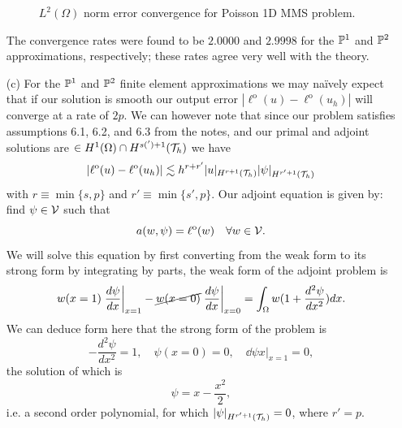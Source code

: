 \documentclass{article}
\begin{document}
\begin{itemize}
\begin{figure}[H]
		\caption{\(L^2(\Omega)\) norm error convergence for Poisson 1D MMS problem.}
		\label{fig:mms_l2}
	\end{figure}
	The convergence rates were found to be \(2.0000\) and \(2.9998\) for the \(\mathbb{P}^1 \) and \(\mathbb{P}^2 \) approximations, respectively; these rates agree very well with the theory.
	\item[(c)] For the \(\mathbb{P}^1 \) and \(\mathbb{P}^2 \) finite element approximations we may na\"ively expect that if our solution is smooth our output error \(|\ell^\text{o}(u) - \ell^\text{o}(u_h)| \) will converge at a rate of \(2p\). We can however note that since our problem satisfies assumptions 6.1, 6.2, and 6.3 from the notes, and our primal and adjoint solutions are \(\in H^1(\Omega) \cap H^{s(')+1}(\mathcal{T}_h) \) we have
	\begin{equation*}
		|\ell^\text{o}(u) - \ell^\text{o}(u_h)| \lesssim h^{r+r'}|u|_{H^{r+1}(\mathcal{T}_h)}|\psi|_{H^{r'+1}(\mathcal{T}_h)}
	\end{equation*}
	with \(r \equiv \min\{s,p\} \) and \(r' \equiv \min\{s',p\} \). Our adjoint equation is given by: find \(\psi \in \mathcal{V} \) such that 
	\begin{equation*}
		a(w,\psi) = \ell^\text{o}(w) \quad \forall w \in \mathcal{V}.
	\end{equation*}
	We will solve this equation by first converting from the weak form to its strong form by integrating by parts, the weak form of the adjoint problem is
	\begin{equation*}
		w(x=1)\left.\frac{d \psi}{d x}\right|_{x=1} - \cancel{w(x=0)}\left.\frac{d \psi}{d x}\right|_{x=0} = \int_\Omega w (1+\dfrac{d^2\psi}{dx^2})dx.
	\end{equation*}
	We can deduce form here that the strong form of the problem is 
	\begin{equation*}
		-\dfrac{d^2\psi}{dx^2} = 1, \quad \psi(x=0) = 0, \quad \left.\dd{\psi}{x}\right|_{x=1} = 0,
	\end{equation*}
	the solution of which is
	\begin{equation*}
		\psi = x - \dfrac{x^2}{2},
	\end{equation*}
	i.e. a second order polynomial, for which \(|\psi|_{H^{r'+1}(\mathcal{T}_h)} = 0 \), where \(r' = p \).
	

\end{itemize}
\end{document}
